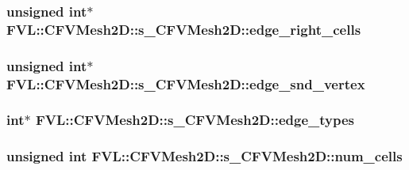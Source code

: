 \label{da/d6f/structFVL_1_1CFVMesh2D_1_1s__CFVMesh2D_a40ae6a2aeddd8ae22b210c3c5551044f}
\hypertarget{structFVL_1_1CFVMesh2D_1_1s__CFVMesh2D_a12742c2714c22273a62a9ce07ee66b41}{
\subsubsection[{edge\_\-right\_\-cells}]{\setlength{\rightskip}{0pt plus 5cm}unsigned int$\ast$ {\bf FVL::CFVMesh2D::s\_\-CFVMesh2D::edge\_\-right\_\-cells}}}
\label{da/d6f/structFVL_1_1CFVMesh2D_1_1s__CFVMesh2D_a12742c2714c22273a62a9ce07ee66b41}
\hypertarget{structFVL_1_1CFVMesh2D_1_1s__CFVMesh2D_aef47aae58ae276b244fd11c9d6878dff}{
\subsubsection[{edge\_\-snd\_\-vertex}]{\setlength{\rightskip}{0pt plus 5cm}unsigned int$\ast$ {\bf FVL::CFVMesh2D::s\_\-CFVMesh2D::edge\_\-snd\_\-vertex}}}
\label{da/d6f/structFVL_1_1CFVMesh2D_1_1s__CFVMesh2D_aef47aae58ae276b244fd11c9d6878dff}
\hypertarget{structFVL_1_1CFVMesh2D_1_1s__CFVMesh2D_a39c8e42575a4c1ad17b17b9cca3389fb}{
\subsubsection[{edge\_\-types}]{\setlength{\rightskip}{0pt plus 5cm}int$\ast$ {\bf FVL::CFVMesh2D::s\_\-CFVMesh2D::edge\_\-types}}}
\label{da/d6f/structFVL_1_1CFVMesh2D_1_1s__CFVMesh2D_a39c8e42575a4c1ad17b17b9cca3389fb}
\hypertarget{structFVL_1_1CFVMesh2D_1_1s__CFVMesh2D_a1c6b6a7f5071a2bfe7bd5a23061a3db6}{
\subsubsection[{num\_\-cells}]{\setlength{\rightskip}{0pt plus 5cm}unsigned int {\bf FVL::CFVMesh2D::s\_\-CFVMesh2D::num\_\-cells}}}
